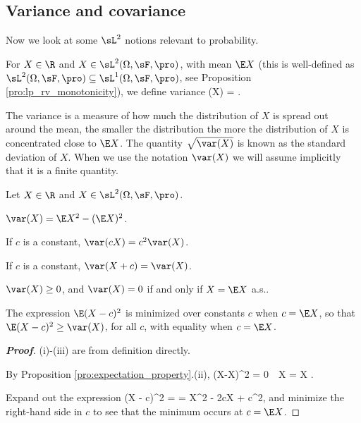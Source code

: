 

\subsection{Variance and covariance}

Now we look at some $\sL^2$ notions relevant to probability.

\begin{definition}\label{def:variance}
For $X\in \R$ and $X \in \sL^2(\Omega,\sF,\pro)$, with mean $\E X$ (this is well-defined as $\sL^2(\Omega,\sF,\pro) \subseteq \sL^1(\Omega,\sF,\pro)$, see Proposition \ref{pro:lp_rv_monotonicity}), we define variance
\be
\var(X) = \E{}.
\ee
\end{definition}

\begin{remark}
The variance is a measure of how much the distribution of $X$ is spread out around the mean, the smaller the distribution the more the distribution of $X$ is concentrated close to $\E X$. The quantity $\sqrt{\var (X)}$ is known as the standard deviation of $X$. When we use the notation $\var (X)$ we will assume implicitly that it is a finite quantity.
\end{remark}

\begin{proposition}
Let $X\in \R$ and $X\in \sL^2(\Omega,\sF,\pro)$.
\ben
\item [(i)] $\var (X) = \E X^2 - (\E X)^2$.
\item [(ii)] If $c$ is a constant, $\var (cX) = c^2 \var (X)$.
\item [(iii)] If $c$ is a constant, $\var (X + c) = \var (X)$.
\item [(iv)] $\var (X) \geq 0$, and $\var (X) = 0$ if and only if $X = \E X$ a.s..
\item [(v)] The expression $\E (X - c)^2$ is minimized over constants $c$ when $c = \E X$, so that $\E (X - c)^2 \geq \var (X)$, for all $c$, with equality when $c = \E X$.
\een
\end{proposition}

\begin{proof}[\bf Proof]
(i)-(iii) are from definition directly.

\ben
\item [(iv)] By Proposition \ref{pro:expectation_property}.(ii),
\be
(X-\E X)^2 = 0\ \ra \ X = \E X .
\ee
\item [(v)] Expand out the expression
\be
\E (X - c)^2 = \E {} = \E X^2 - 2c\E X + c^2,
\ee
and minimize the right-hand side in $c$ to see that the minimum occurs at $c = \E X$.
\een
\end{proof}

